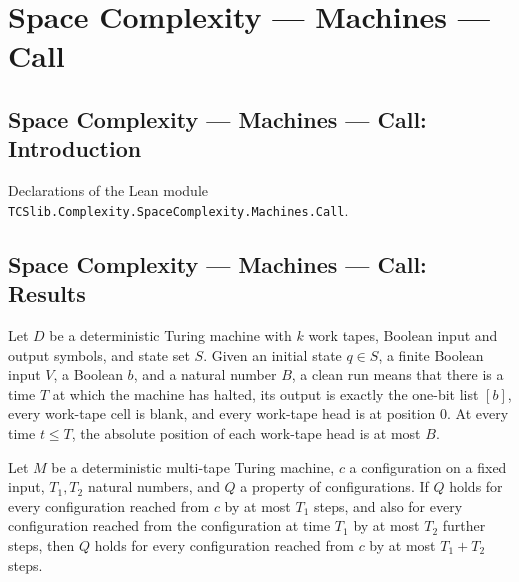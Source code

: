 \section{Space Complexity --- Machines --- Call}
\subsection*{Space Complexity --- Machines --- Call: Introduction}

Declarations of the Lean module \texttt{TCSlib.Complexity.SpaceComplexity.Machines.Call}.

\subsection*{Space Complexity --- Machines --- Call: Results}

\begin{definition}
\label{Complexity.LogProg.CleanRun}
\leanok
{}
Let $D$ be a deterministic Turing machine with $k$ work tapes, Boolean input and output
symbols, and state set $S$. Given an initial state $q\in S$, a finite Boolean input $V$,
a Boolean $b$, and a natural number $B$, a clean run means that there is a time $T$ at
which the machine has halted, its output is exactly the one-bit list $[b]$, every
work-tape cell is blank, and every work-tape head is at position $0$. At every time
$t\le T$, the absolute position of each work-tape head is at most $B$.
\end{definition}

\begin{lemma}
\label{Complexity.LogProg.runFrom_forall_append}
\leanok
{}
Let $M$ be a deterministic multi-tape Turing machine, $c$ a configuration on a fixed
input, $T_1,T_2$ natural numbers, and $Q$ a property of configurations. If $Q$ holds for
every configuration reached from $c$ by at most $T_1$ steps, and also for every
configuration reached from the configuration at time $T_1$ by at most $T_2$ further
steps, then $Q$ holds for every configuration reached from $c$ by at most $T_1+T_2$
steps.
\end{lemma}


